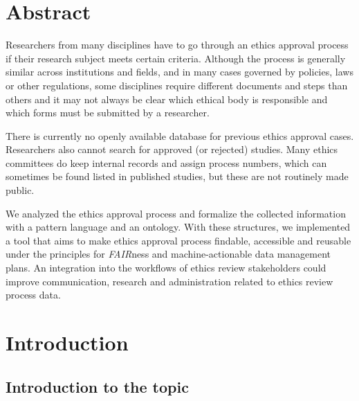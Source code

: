 \documentclass[10pt]{article}
\begin{document}
 
 
 \newpage
 \section*{Abstract}
 
Researchers from many disciplines have to go through an ethics approval process if their research subject meets certain criteria. 
Although the process is generally similar across institutions and fields, and in many cases governed by policies, laws or other regulations, some disciplines require different documents and steps than others and it may not always be clear which ethical body is responsible and which forms must be submitted by a researcher. 

There is currently no openly available database for previous ethics approval cases. Researchers also cannot search for approved (or rejected) studies. Many ethics committees do keep internal records and assign process numbers, which can sometimes be found listed in published studies, but these are not routinely made public. 

We analyzed the ethics approval process and formalize the collected information with a pattern language and an ontology. With these structures, we implemented a tool that aims to make ethics approval process findable, accessible and reusable under the principles for \textit{FAIR}ness and machine-actionable data management plans. An integration into the workflows of ethics review stakeholders could improve communication, research and administration related to ethics review process data.
 
 \newpage
\tableofcontents
\newpage


\section{Introduction}
\label{sec:introduction}
\subsection{Introduction to the topic}
\end{document}
